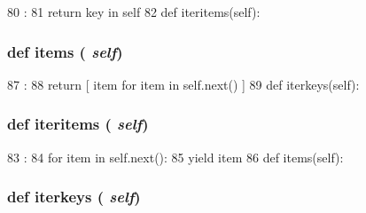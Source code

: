 \begin{DoxyCode}
80                           :
81         return key in self
82 
    def iteritems(self):
\end{DoxyCode}
\hypertarget{classm5_1_1util_1_1multidict_1_1multidict_a717291221885735d6870d7179083ec07}{
\subsubsection[{items}]{\setlength{\rightskip}{0pt plus 5cm}def items ( {\em self})}}
\label{classm5_1_1util_1_1multidict_1_1multidict_a717291221885735d6870d7179083ec07}



\begin{DoxyCode}
87                    :
88         return [ item for item in self.next() ]
89 
    def iterkeys(self):
\end{DoxyCode}
\hypertarget{classm5_1_1util_1_1multidict_1_1multidict_a13d39839ad1cfd4c47f524735933c0bf}{
\subsubsection[{iteritems}]{\setlength{\rightskip}{0pt plus 5cm}def iteritems ( {\em self})}}
\label{classm5_1_1util_1_1multidict_1_1multidict_a13d39839ad1cfd4c47f524735933c0bf}



\begin{DoxyCode}
83                        :
84         for item in self.next():
85             yield item
86 
    def items(self):
\end{DoxyCode}
\hypertarget{classm5_1_1util_1_1multidict_1_1multidict_a44560b0b40dfcd2069b980760783cc7b}{
\subsubsection[{iterkeys}]{\setlength{\rightskip}{0pt plus 5cm}def iterkeys ( {\em self})}}
\label{classm5_1_1util_1_1multidict_1_1multidict_a44560b0b40dfcd2069b980760783cc7b}



